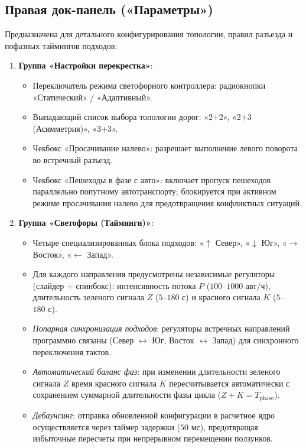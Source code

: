 \documentclass[11pt, a4paper]{article}
\begin{document}
\subsection{Правая док-панель («Параметры»)}
Предназначена для детального конфигурирования топологии, правил разъезда и пофазных таймингов подходов:
\begin{enumerate}
  \item \textbf{Группа «Настройки перекрестка»}:
  \begin{itemize}
    \item Переключатель режима светофорного контроллера: радиокнопки «Статический» / «Адаптивный».
    \item Выпадающий список выбора топологии дорог: «2+2», «2+3 (Асимметрия)», «3+3».
    \item Чекбокс «Просачивание налево»: разрешает выполнение левого поворота во встречный разъезд.
    \item Чекбокс «Пешеходы в фазе с авто»: включает пропуск пешеходов параллельно попутному автотранспорту; блокируется при активном режиме просачивания налево для предотвращения конфликтных ситуаций.
  \end{itemize}
  \item \textbf{Группа «Светофоры (Тайминги)»}:
  \begin{itemize}
    \item Четыре специализированных блока подходов: «$\uparrow$ Север», «$\downarrow$ Юг», «$\rightarrow$ Восток», «$\leftarrow$ Запад».
    \item Для каждого направления предусмотрены независимые регуляторы (слайдер + спинбокс): интенсивность потока $P$ ($100$--$1000\text{ авт/ч}$), длительность зеленого сигнала $Z$ ($5$--$180\text{ с}$) и красного сигнала $K$ ($5$--$180\text{ с}$).
    \item \textit{Попарная синхронизация подходов}: регуляторы встречных направлений программно связаны (Север $\leftrightarrow$ Юг, Восток $\leftrightarrow$ Запад) для синхронного переключения тактов.
    \item \textit{Автоматический баланс фаз}: при изменении длительности зеленого сигнала $Z$ время красного сигнала $K$ пересчитывается автоматически с сохранением суммарной длительности фазы цикла ($Z + K = T_{\text{phase}}$).
    \item \textit{Дебаунсинг}: отправка обновленной конфигурации в расчетное ядро осуществляется через таймер задержки ($50\text{ мс}$), предотвращая избыточные пересчеты при непрерывном перемещении ползунков.
  \end{itemize}
\end{enumerate}
\end{document}
